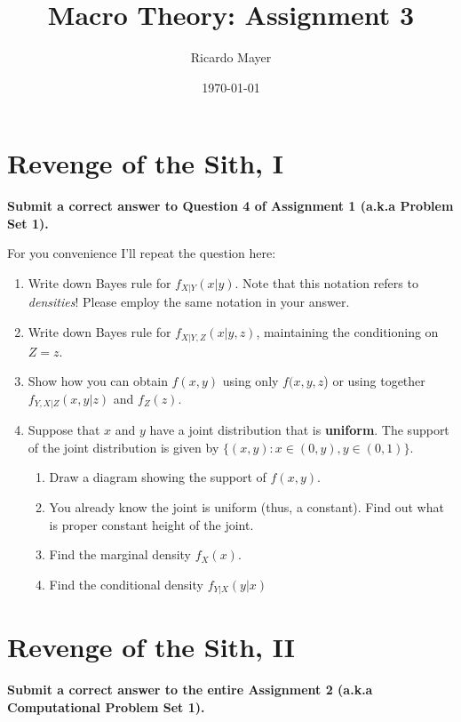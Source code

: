 \documentclass[11pt]{article}
\begin{document}
\title{Macro Theory: Assignment 3}
\author{Ricardo Mayer}
\date{\today}
\maketitle


\section{Revenge of the Sith, I}
\textbf{Submit a correct answer to Question 4 of Assignment 1 (a.k.a Problem Set 1).}

For you convenience I'll repeat the question here:

\begin{enumerate}
\item Write down Bayes rule for $f_{X|Y}(x|y)$. Note that this notation refers to \emph{densities}! Please employ the same notation in your answer.

\item Write down Bayes rule for $f_{X|Y,Z}(x|y,z)$, maintaining the conditioning on $Z=z$.

\item Show how  you can obtain $f(x,y)$ using only $f(x,y,z$) or using together $f_{Y,X|Z}(x,y|z)$ and $f_{Z}(z)$.

\item Suppose that $x$ and $y$ have a joint distribution that is \textbf{uniform}. The support of the joint distribution is given by $\{(x,y): x \in (0,y), y \in (0,1)\}$.
   \begin{enumerate}
     \item Draw a diagram showing the support of $f(x,y)$.
   
     \item You already know the joint is uniform (thus, a constant). Find out what is proper constant height of the joint.
   
     \item Find the marginal density  $f_X(x)$.
   
     \item Find the conditional density $f_{Y|X}(y|x)$   
   \end{enumerate}

\end{enumerate}

\section{Revenge of the Sith, II}
\textbf{Submit a correct answer to the entire Assignment 2 (a.k.a Computational Problem Set 1).}
\end{document}
